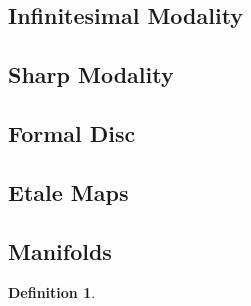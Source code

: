 \documentclass{article}
\theoremstyle{definition}
\newtheorem{definition}{Definition}
\begin{document}
\subsection{Infinitesimal Modality}

\subsection{Sharp Modality}

\subsection{Formal Disc}

\subsection{Etale Maps}

\subsection{Manifolds}

\begin{definition}
\end{definition}



\end{document}
